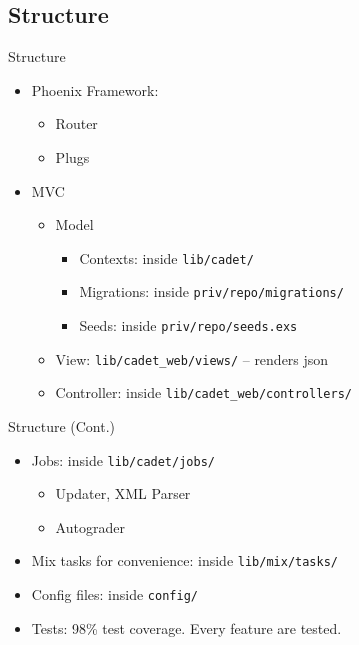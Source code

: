 \documentclass[12pt]{beamer}
\begin{document}
\subsection{Structure}
\begin{frame}{Structure}
  \begin{itemize}
    \item Phoenix Framework:
          \begin{itemize}
            \item Router
            \item Plugs
          \end{itemize}
    \item MVC
          \begin{itemize}
            \item Model
                  \begin{itemize}
                    \item Contexts: inside \texttt{lib/cadet/}
                    \item Migrations: inside \texttt{priv/repo/migrations/}
                    \item Seeds: inside \texttt{priv/repo/seeds.exs}
                  \end{itemize}
            \item View: \texttt{lib/cadet\_web/views/} -- renders json
            \item Controller: inside \texttt{lib/cadet\_web/controllers/}
          \end{itemize}
  \end{itemize}
\end{frame}

\begin{frame}{Structure (Cont.)}
  \begin{itemize}
    \item Jobs: inside \texttt{lib/cadet/jobs/}
          \begin{itemize}
            \item Updater, XML Parser
            \item Autograder
          \end{itemize}
    \item Mix tasks for convenience: inside \texttt{lib/mix/tasks/}
    \item Config files: inside \texttt{config/}
    \item Tests: 98\% test coverage. Every feature are tested.
  \end{itemize}
\end{frame}
\end{document}
